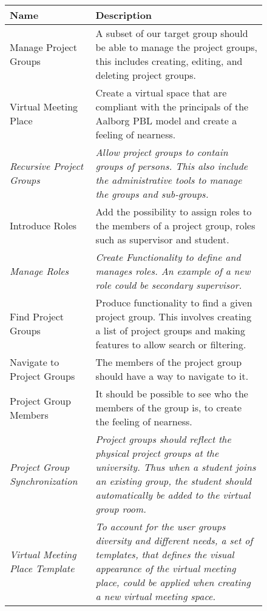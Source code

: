 \begin{figure}%
\begin{tabular}{|p{}|p{}|}
	\hline
	
	\textbf{Name} & \textbf{Description} \\
	\hline
	Manage Project Groups & A subset of our target group should be able to manage the project groups, this includes creating, editing, and deleting project groups.  \\
	\hline
	Virtual Meeting Place & Create a virtual space that are compliant with the principals of the Aalborg PBL model and create a feeling of nearness.  \\
	\hline
	\textit{Recursive Project Groups} & \textit{Allow project groups to contain groups of persons. This also include the administrative tools to manage the groups and sub-groups.} \\
	\hline
	Introduce Roles & Add the possibility to assign roles to the members of a project group, roles such as supervisor and student.   \\
	\hline
	\textit{Manage Roles} & \textit{Create Functionality to define and manages roles. An example of a new role  could be secondary supervisor.} \\
	\hline
	Find Project Groups & Produce functionality to find a given project group. This involves creating a list of project groups and making features to allow search or filtering. \\
	\hline
	Navigate to Project Groups & The members of the project group should have a way to navigate to it. \\
	\hline
	Project Group Members & It should be possible to see who the members of the group is, to create the feeling of nearness. \\
	\hline
	\textit{Project Group Synchronization} & \textit{Project groups should reflect the physical project groups at the university. Thus when a student joins an existing group, the student should automatically be added to the virtual group room.}  \\
	\hline 
	\textit{Virtual Meeting Place Template} & \textit{To account for the user groups diversity and different needs, a set of templates, that defines the visual appearance of the virtual meeting place, could be applied when creating a new virtual meeting space.}  \\
	\hline 
\end{tabular}
\label{fig:productbacklog}
\end{figure}

